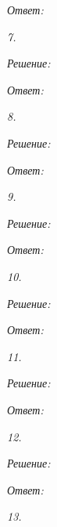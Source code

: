 \vspace*{2em}
\emph{Ответ: }


\emph{7.}

\vspace*{2em}
\emph{Решение:}

\vspace*{2em}
\emph{Ответ: }


\emph{8.}

\vspace*{2em}
\emph{Решение:}

\vspace*{2em}
\emph{Ответ: }


\emph{9.}

\vspace*{2em}
\emph{Решение:}

\vspace*{2em}
\emph{Ответ: }


\emph{10.}

\vspace*{2em}
\emph{Решение:}

\vspace*{2em}
\emph{Ответ: }


\emph{11.}

\vspace*{2em}
\emph{Решение:}

\vspace*{2em}
\emph{Ответ: }


\emph{12.}

\vspace*{2em}
\emph{Решение:}

\vspace*{2em}
\emph{Ответ: }


\emph{13.}

